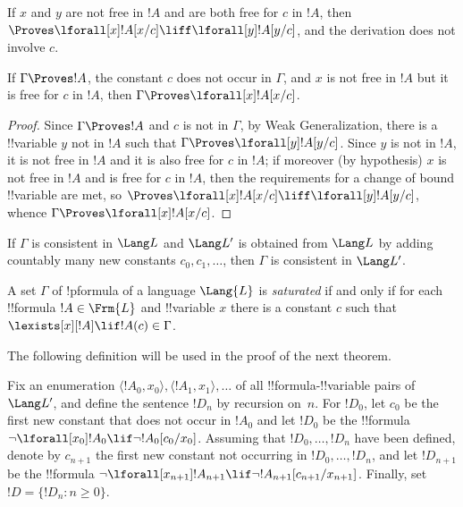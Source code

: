 \documentclass[../../include/open-logic-section]{subfiles}
\begin{document}

\begin{prop}
If $x$ and $y$ are not free in $!A$ and are both free for $c$ in $!A$,
then $\Proves \lforall[x] !A[x/c] \liff \lforall[y] !A[y/c]$, and the
derivation does not involve $c$.
\end{prop}

\begin{thm}
If $\Gamma \Proves !A$, the constant $c$ does not occur in $\Gamma$,
and $x$ is not free in $!A$ but it is free for $c$ in $!A$, then
$\Gamma \Proves \lforall[x] !A[x/c]$.
\end{thm}

\begin{proof}
Since $\Gamma \Proves !A$ and $c$ is not in $\Gamma$, by Weak
Generalization, there is a !!{variable} $y$ not in $!A$ such that $\Gamma
\Proves \lforall[y] !A [y/c]$.  Since $y$ is not in $!A$, it is not
free in $!A$ and it is also free for $c$ in $!A$; if moreover (by
hypothesis) $x$ is not free in $!A$ and is free for $c$ in $!A$, then
the requirements for a change of bound !!{variable} are met, so $\Proves
\lforall[x] !A[x/c] \liff \lforall[y] !A[y/c]$, whence $\Gamma \Proves
\lforall[x] !A[x/c]$.
\end{proof}

\begin{lem}
If $\Gamma$ is consistent in $\Lang L$ and $\Lang L'$ is obtained from
$\Lang L$ by adding countably many new constants $c_0, c_1, \dots$,
then $\Gamma$ is consistent in $\Lang L'$.
\end{lem}

\begin{defn}
  A set $\Gamma$ of !p{formula} of a language $\Lang {L}$ is
  \emph{saturated} if and only if for each !!{formula} $!A \in
  \Frm {L}$ and !!{variable} $x$ there is a constant $c$ such that
  $\lexists[x][!A] \lif !A(c) \in \Gamma$.
\end{defn}


The following definition will be used in the proof of the next theorem.

\begin{defn}
Fix an enumeration $\langle !A_0, x_0 \rangle, \langle !A_1, x_1
\rangle, \dots$ of all !!{formula}-!!{variable} pairs of $\Lang L'$, and
define the sentence $!D_n$ by recursion on~$n$. For $!D_0$,
let $c_0$ be the first new constant that does not occur in $!A_0$ and
let $!D_0$ be the !!{formula} $\lnot \lforall[x_0] !A_0 \lif \lnot
!A_0[c_0/x_0]$. Assuming that $!D_0, \dots, !D_n$ have been
defined, denote by $c_{n+1}$ the first new constant not occurring in
$!D_0, \dots, !D_n$, and let $!D_{n+1}$ be the !!{formula}
$\lnot \lforall[x_{n+1}] !A_{n+1} \lif \lnot
!A_{n+1}[c_{n+1}/x_{n+1}]$. Finally, set $!D = \{ !D_n : n
\geq 0 \}$.
\end{defn}
\end{document}
